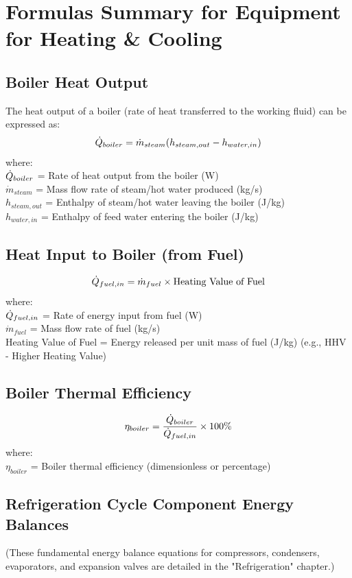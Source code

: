 \section{Formulas Summary for Equipment for Heating \& Cooling}

\subsection{Boiler Heat Output}
The heat output of a boiler (rate of heat transferred to the working fluid) can be expressed as:
\begin{equation}
    \dot{Q}_{boiler} = \dot{m}_{steam} (h_{steam,out} - h_{water,in})
\end{equation}
where: \\
$\dot{Q}_{boiler}$ = Rate of heat output from the boiler (W) \\
$\dot{m}_{steam}$ = Mass flow rate of steam/hot water produced (kg/s) \\
$h_{steam,out}$ = Enthalpy of steam/hot water leaving the boiler (J/kg) \\
$h_{water,in}$ = Enthalpy of feed water entering the boiler (J/kg)

\subsection{Heat Input to Boiler (from Fuel)}
\begin{equation}
    \dot{Q}_{fuel,in} = \dot{m}_{fuel} \times \text{Heating Value of Fuel}
\end{equation}
where: \\
$\dot{Q}_{fuel,in}$ = Rate of energy input from fuel (W) \\
$\dot{m}_{fuel}$ = Mass flow rate of fuel (kg/s) \\
Heating Value of Fuel = Energy released per unit mass of fuel (J/kg) (e.g., HHV - Higher Heating Value)

\subsection{Boiler Thermal Efficiency}
\begin{equation}
    \eta_{boiler} = \frac{\dot{Q}_{boiler}}{\dot{Q}_{fuel,in}} \times 100\%
\end{equation}
where: \\
$\eta_{boiler}$ = Boiler thermal efficiency (dimensionless or percentage)

\subsection{Refrigeration Cycle Component Energy Balances}
(These fundamental energy balance equations for compressors, condensers, evaporators, and expansion valves are detailed in the "Refrigeration" chapter.)
